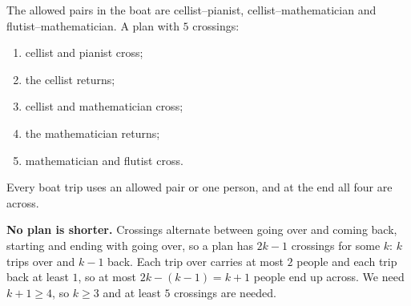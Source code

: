 The allowed pairs in the boat are cellist--pianist, cellist--mathematician and flutist--mathematician. A plan with $5$ crossings:
\begin{enumerate}
\item cellist and pianist cross;
\item the cellist returns;
\item cellist and mathematician cross;
\item the mathematician returns;
\item mathematician and flutist cross.
\end{enumerate}
Every boat trip uses an allowed pair or one person, and at the end all four are across.

\textbf{No plan is shorter.} Crossings alternate between going over and coming back, starting and ending with going over, so a plan has $2k-1$ crossings for some $k$: $k$ trips over and $k-1$ back. Each trip over carries at most $2$ people and each trip back at least $1$, so at most $2k-(k-1)=k+1$ people end up across. We need $k+1\ge4$, so $k\ge3$ and at least $\boxed{5}$ crossings are needed.

